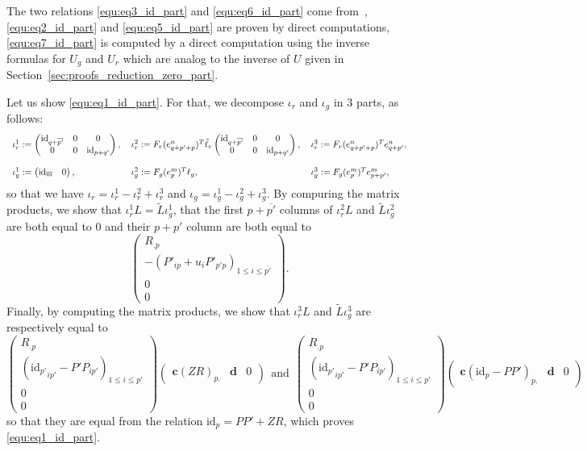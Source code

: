 \documentclass[10pt]{article}
\newcommand\g[1]{\textbf{#1}}
\newcommand\id[1]{\text{id}_{#1}}
\begin{document}
The two relations \eqref{equ:eq3_id_part} and \eqref{equ:eq6_id_part}
come from~\cite{cluzeau2011constructive}, \eqref{equ:eq2_id_part} and
\eqref{equ:eq5_id_part} are proven by direct computations,
\eqref{equ:eq7_id_part} is computed by a direct computation using the
inverse formulas for $U_g$ and $U_r$ which are analog to the inverse of
$U$ given in Section~\ref{sec:proofs_reduction_zero_part}.

Let us show \eqref{equ:eq1_id_part}. For that, we decompose $\iota_r$ and
$\iota_g$ in $3$ parts, as follows:
\[
\begin{tabular}{l l l}
  $\iota_r^1:= \begin{pmatrix}
    \id{q+\overline{p'}} & 0 & 0\\
    0 & 0 & \id{p+q'}
  \end{pmatrix},$ &
  $\iota_r^2:= F_r(e^n_{q+p'+p})^T\tilde{\ell}_r\begin{pmatrix}
    \id{q+\overline{p'}} & 0 & 0\\
    0 & 0 & \id{p+q'}
  \end{pmatrix},$ &
  $\iota_r^3:= F_r(e^n_{q+p'+p})^Te^n_{q+p'},$
  \\
  & & \\
  $\iota_g^1:= \begin{pmatrix}
    \id{\overline{m}} & 0
    \end{pmatrix},$ &
  $\iota_g^2:= F_g(e^m_p)^T\ell_g,$ &
  $\iota_g^3:= F_g(e^m_p)^Te^m_{p+p'},$
\end{tabular}
\]
so that we have $\iota_r=\iota_r^1-\iota_r^2+\iota_r^3$ and $\iota_g=
\iota_g^1-\iota_g^2+\iota_g^3$. By compuring the matrix products, we show
that $\iota_r^1L=\tilde{L}\iota_g^1$, that the first $p+\overline{p'}$
columns of $\iota_r^2L$ and $\tilde{L}\iota_g^2$ are both equal to $0$
and their $p+p'$ column are both equal to
\[\begin{pmatrix}
R_{.p}\\
-\left(P'_{ip}+u_iP'_{p'p}\right)_{1\leq i\leq\overline{p'}}\\
0\\
0
\end{pmatrix}.\]
Finally, by computing the matrix products, we show that $\iota_r^3L$ and
$\tilde{L}\iota_g^3$ are respectively equal to
\[\begin{pmatrix}
R_{.p}\\
\left({\id{p'}}_{ip'}-P'P_{ip'}\right)_{1\leq i\leq p'}\\
0\\
0
\end{pmatrix}\begin{pmatrix}
  \g{c}\left(ZR\right)_{p.} & \g{d} & 0
\end{pmatrix}\ \ \text{and}\ \
\begin{pmatrix}
R_{.p}\\
\left({\id{p'}}_{ip'}-P'P_{ip'}\right)_{1\leq i\leq p'}\\
0\\
0
\end{pmatrix}\begin{pmatrix}
  \g{c}\left(\id{p}-PP'\right)_{p.} & \g{d} & 0
\end{pmatrix}\]
so that they are equal from the relation $\id{p}=PP'+ZR$, which proves
\eqref{equ:eq1_id_part}.
\end{document}
